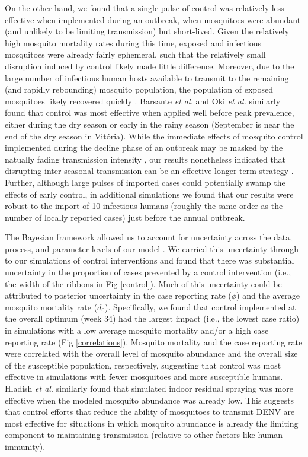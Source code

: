 \documentclass[10pt,letterpaper]{article}
\begin{document}
On the other hand, we found that a single pulse of control was relatively less effective when implemented during an outbreak, when mosquitoes were abundant (and unlikely to be limiting transmission) but short-lived.
Given the relatively high mosquito mortality rates during this time, exposed and infectious mosquitoes were already fairly ephemeral, such that the relatively small disruption induced by control likely made little difference.
Moreover, due to the large number of infectious human hosts available to transmit to the remaining (and rapidly rebounding) mosquito population, the population of exposed mosquitoes likely recovered quickly \cite{Newton1992, Burattini2008}.
Barsante \emph{et al.} \cite{Barsante2015} and Oki \emph{et al.} \cite{Oki2011} similarly found that control was most effective when applied well before peak prevalence, either during the dry season \cite{Barsante2015} or early in the rainy season \cite{Oki2011} (September is near the end of the dry season in Vit\'oria).
While the immediate effects of mosquito control implemented during the decline phase of an outbreak may be masked by the natually fading transmission intensity \cite{Stoddard2014}, our results nonetheless indicated that disrupting inter-seasonal transmission can be an effective longer-term strategy \cite{Hladish2018}.
Further, although large pulses of imported cases could potentially swamp the effects of early control, in additional simulations we found that our results were robust to the import of 10 infectious humans (roughly the same order as the number of locally reported cases) just before the annual outbreak.

The Bayesian framework allowed us to account for uncertainty across the data, process, and parameter levels of our model \cite{Berliner1996}.
We carried this uncertainty through to our simulations of control interventions \cite{Elderd2006} and found that there was substantial uncertainty in the proportion of cases prevented by a control intervention (i.e., the width of the ribbons in Fig \ref{control}).
Much of this uncertainty could be attributed to posterior uncertainty in the case reporting rate ($\phi$) and the average mosquito mortality rate ($d_0$).
Specifically, we found that control implemented at the overall optimum (week 34) had the largest impact (i.e., the lowest case ratio) in simulations with a low average mosquito mortality and/or a high case reporting rate (Fig \ref{correlations}).
Mosquito mortality and the case reporting rate were correlated with the overall level of mosquito abundance and the overall size of the susceptible population, respectively, suggesting that control was most effective in simulations with fewer mosquitoes and more susceptible humans.  
Hladish \emph{et al.} \cite{Hladish2018} similarly found that simulated indoor residual spraying was more effective when the modeled mosquito abundance was already low.
This suggests that control efforts that reduce the ability of mosquitoes to transmit DENV are most effective for situations in which mosquito abundance is already the limiting component to maintaining transmission (relative to other factors like human immunity).
\end{document}
